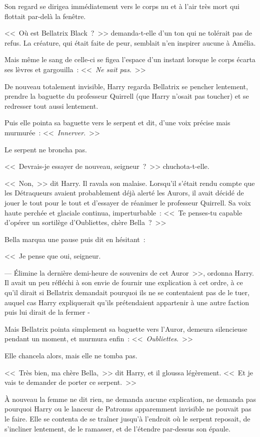 Son regard se dirigea immédiatement vers le corps nu et à l'air très mort qui flottait par-delà la fenêtre.

<<~Où est Bellatrix Black~?~>> demanda-t-elle d'un ton qui ne tolérait pas de refus. La créature, qui était faite de peur, semblait n'en inspirer aucune à Amélia.

Mais même le sang de celle-ci se figea l'espace d'un instant lorsque le corps écarta ses lèvres et gargouilla~: <<~\emph{Ne sait pas}.~>>

\later

De nouveau totalement invisible, Harry regarda Bellatrix se pencher lentement, prendre la baguette du professeur Quirrell (que Harry n'osait pas toucher) et se redresser tout aussi lentement.

Puis elle pointa sa baguette vers le serpent et dit, d'une voix précise mais murmurée~: <<~\emph{Innerver}.~>>

Le serpent ne broncha pas.

<<~Devrais-je essayer de nouveau, seigneur~?~>> chuchota-t-elle.

<<~Non,~>> dit Harry. Il ravala son malaise. Lorsqu'il s'était rendu compte que les Détraqueurs avaient probablement déjà alerté les Aurors, il avait décidé de jouer le tout pour le tout et d'essayer de réanimer le professeur Quirrell. Sa voix haute perchée et glaciale continua, imperturbable~: <<~Te penses-tu capable d'opérer un sortilège d'Oubliettes, chère Bella~?~>>

Bella marqua une pause puis dit en hésitant~:

<<~Je pense que oui, seigneur.

--- Élimine la dernière demi-heure de souvenirs de cet Auror~>>, ordonna Harry. Il avait un peu réfléchi à son envie de fournir une explication à cet ordre, à ce qu'il dirait si Bellatrix demandait pourquoi ils ne se contentaient pas de le tuer, auquel cas Harry expliquerait qu'ils prétendaient appartenir à une autre faction puis lui dirait de la fermer -

Mais Bellatrix pointa simplement sa baguette vers l'Auror, demeura silencieuse pendant un moment, et murmura enfin~: <<~\emph{Oubliettes}.~>>

Elle chancela alors, mais elle ne tomba pas.

<<~Très bien, ma chère Bella,~>> dit Harry, et il gloussa légèrement. <<~Et je vais te demander de porter ce serpent.~>>

À nouveau la femme ne dit rien, ne demanda aucune explication, ne demanda pas pourquoi Harry ou le lanceur de Patronus apparemment invisible ne pouvait pas le faire. Elle se contenta de se traîner jusqu'à l'endroit où le serpent reposait, de s'incliner lentement, de le ramasser, et de l'étendre par-dessus son épaule.

